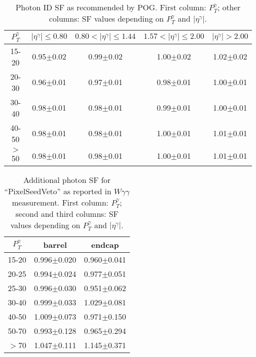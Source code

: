 \begin{table}[h]
  \footnotesize
  \begin{center}
  \caption{Photon ID SF as recommended by POG. First column: $P_T^{\gamma}$; other columns: SF values depending on $P_T^{\gamma}$ and $|\eta^{\gamma}|$.} 
   \begin{tabular}{|c|c|c|c|c|}
 $P_T^{\gamma}$  & $|\eta^{\gamma}|\leq 0.80$ & $0.80<|\eta^{\gamma}|\leq 1.44$ & $1.57<|\eta^{\gamma}|\leq 2.00$ & $|\eta^{\gamma}|> 2.00$\\ \hline
15-20          & 0.95$\pm$0.02   & 0.99$\pm$0.02        & 1.00$\pm$0.02        & 1.02$\pm$0.02 \\ \hline
20-30          & 0.96$\pm$0.01   & 0.97$\pm$0.01        & 0.98$\pm$0.01        & 1.00$\pm$0.01 \\ \hline
30-40          & 0.98$\pm$0.01   & 0.98$\pm$0.01        & 0.99$\pm$0.01        & 1.00$\pm$0.01 \\ \hline
40-50          & 0.98$\pm$0.01   & 0.98$\pm$0.01        & 1.00$\pm$0.01        & 1.01$\pm$0.01 \\ \hline
$>$50          & 0.98$\pm$0.01   & 0.98$\pm$0.01        & 1.00$\pm$0.01        & 1.01$\pm$0.01 \\ \hline
  \end{tabular}
  \label{tab:SFs_PhotonID}
  \end{center}
\end{table}

\begin{table}[h]
  \footnotesize
  \begin{center}
  \caption{Additional photon SF for ``PixelSeedVeto'' as reported in $W\gamma\gamma$ measurement. First column: $P_T^{\gamma}$; second and third columns: SF values depending on $P_T^{\gamma}$ and $|\eta^{\gamma}|$.} 
   \begin{tabular}{|c|c|c|}
 $P_T^{\gamma}$  & barrel              & endcap \\ \hline
15-20          & 0.996$\pm$0.020     & 0.960$\pm$0.041 \\ \hline
20-25          & 0.994$\pm$0.024     & 0.977$\pm$0.051 \\ \hline
25-30          & 0.996$\pm$0.030     & 0.951$\pm$0.062 \\ \hline
30-40          & 0.999$\pm$0.033     & 1.029$\pm$0.081 \\ \hline
40-50          & 1.009$\pm$0.073     & 0.971$\pm$0.150 \\ \hline
50-70          & 0.993$\pm$0.128     & 0.965$\pm$0.294 \\ \hline
$>$70          & 1.047$\pm$0.111     & 1.145$\pm$0.371 \\ \hline

  \end{tabular}
  \label{tab:SFs_PhotonPixelSeedVeto}
  \end{center}
\end{table}
